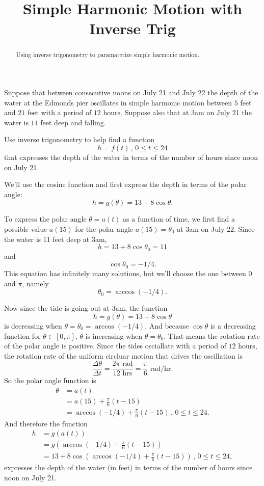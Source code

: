 \documentclass{ximera}
\title{Simple Harmonic Motion with Inverse Trig}
\begin{document}
\begin{abstract}
Using inverse trigonometry to paramaterize simple harmonic motion.
\end{abstract}
\maketitle

\begin{example} \label{Qpvce30}
Suppose that between consecutive noons on July 21 and July 22 the depth of the water at the Edmonds pier oscillates in simple harmonic motion between $5$ feet and $21$ feet with a period of $12$ hours. Suppose also that at 3am on July 21 the water is $11$ feet deep and falling.

Use inverse trigonometry to help find a function
\[
  h = f(t) \, , \, 0\leq t \leq 24
\]
that expresses the depth of the water in terms of the number of hours since noon on July 21.

\begin{explanation}
We'll use the cosine function and first express the depth in terms of the polar angle:
\[
  h = g(\theta) = 13 + 8\cos\theta.
\]

To express the polar angle $\theta = a(t)$ as a function of time, we first find a possible value $a(15)$ for the polar angle $a(15) = \theta_0$ at 3am on July 22. Since the water is 11 feet deep at 3am,
\[
  h = 13 + 8\cos\theta_0 = 11
\]
and
\[
  \cos\theta_0 = -1/4.
\]
This equation has infinitely many solutions, but we'll choose the one between $0$ and $\pi$, namely
\[
 \theta_ 0 = \arccos(-1/4).
\]

Now since the tide is going out at 3am, the function
\[
  h = g(\theta) = 13 + 8\cos\theta
\]
is decreasing when $\theta=\theta_0 =  \arccos(-1/4)$. And because $\cos\theta$ is a decreasing function for $\theta\in [0,\pi]$,  $\theta$ is increasing when $\theta=\theta_0$. That means the rotation rate of the polar angle is positive. Since the tides osciallate with a period of $12$ hours, the rotation rate of the uniform circluar motion that drives the oscillation is
\[
  \frac{\Delta \theta}{\Delta t} = \frac{2\pi \text{ rad}}{12\text{ hrs}} = \frac{\pi}{6} \text{ rad/hr}.
\]
So the polar angle function is
\begin{align*}
  \theta &= a(t) \\
           &= a(15) + \frac{\pi}{6}\left( t-15 \right) \\
           &= \arccos(-1/4) + \frac{\pi}{6}\left( t-15 \right) \, , \, 0\leq t \leq 24. 
\end{align*}
And therefore the function
\begin{align*}
   h &= g(a(t)) \\
      &= g\left( \arccos(-1/4) + \frac{\pi}{6}\left( t-15 \right) \right)  \\
      &= 13 + 8\cos \left(  \arccos(-1/4) + \frac{\pi}{6}\left( t-15 \right) \right) \, , \, 0\leq t \leq 24,
\end{align*}
expresses the depth of the water (in feet) in terms of the number of hours since noon on July 21.
\end{explanation}
\end{example}
\end{document}
